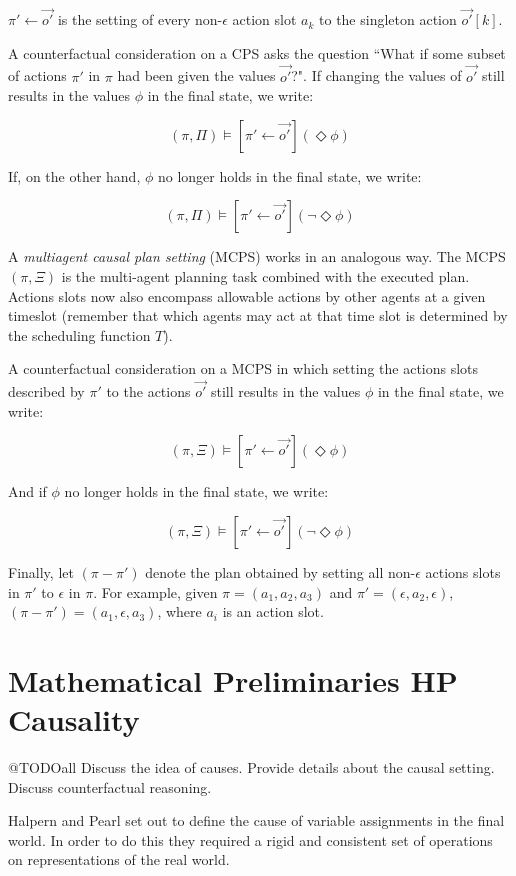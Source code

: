 \documentclass{article}
\theoremstyle{plain}
\theoremstyle{definition}
\begin{document}
$\pi' \leftarrow \vec{o'}$ is the setting of every non-$\epsilon$ action slot $a_k$ to the singleton action $\vec{o'}[k]$.


A counterfactual consideration on a CPS asks the question ``What if some subset of actions $\pi'$ in $\pi$ had been given the values $\vec{o'}$?". If changing the values of $\vec{o'}$ still results in the values $\phi$ in the final state, we write:

\[
(\pi, \Pi) \models [\pi' \leftarrow \vec{o'}](\Diamond \phi)
\]

If, on the other hand, $\phi$ no longer holds in the final state, we write:

\[
(\pi, \Pi) \models [\pi' \leftarrow \vec{o'}](\lnot \Diamond \phi)
\]


A \textit{multiagent causal plan setting} (MCPS) works in an analogous way. The MCPS $(\pi,\Xi)$ is the multi-agent planning task combined with the executed plan. Actions slots now also encompass allowable actions by other agents at a given timeslot (remember that which agents may act at that time slot is determined by the scheduling function $T$).

A counterfactual consideration on a MCPS in which setting the actions slots described by $\pi'$ to the actions $\vec{o'}$ still results in the values $\phi$ in the final state, we write:

\[
(\pi, \Xi) \models [\pi' \leftarrow \vec{o'}](\Diamond \phi)
\]

And if $\phi$ no longer holds in the final state, we write:

\[
(\pi, \Xi) \models [\pi' \leftarrow \vec{o'}](\lnot \Diamond \phi)
\]

Finally, let $(\pi-\pi')$ denote the plan obtained by setting all non-$\epsilon$ actions slots in $\pi'$ to $\epsilon$ in $\pi$. For example, given $\pi=(a_1,a_2,a_3)$ and $\pi'=(\epsilon, a_2, \epsilon)$, $(\pi-\pi')=(a_1, \epsilon, a_3)$, where $a_i$ is an action slot.

\section{Mathematical Preliminaries HP Causality}

@TODOall  Discuss the idea of causes. Provide details about the causal setting. Discuss counterfactual reasoning.

Halpern and Pearl \cite{halpern2005causes} set out to define the cause of variable assignments in the final world. In order to do this they required a rigid and consistent set of operations on representations of the real world.
\end{document}
